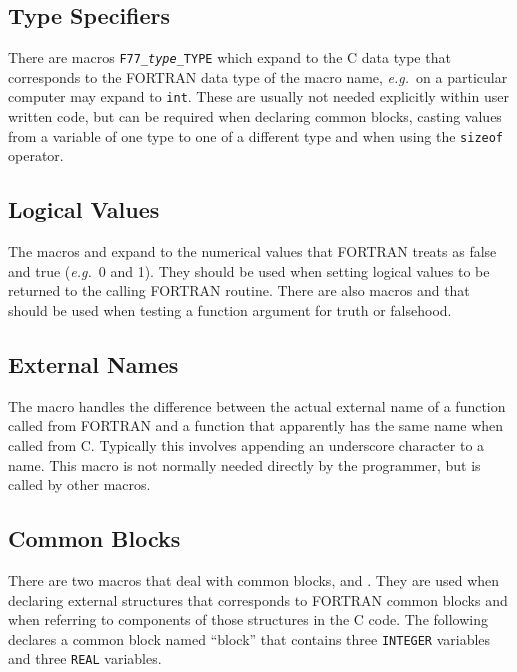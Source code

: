 \documentclass[twoside,11pt,nolof]{starlink}
\begin{document}
\subsection{Type Specifiers}

There are macros \texttt{F77\_\textit{type}\_TYPE}
which expand to the C data type that corresponds to the FORTRAN data type of
the macro name, \textit{e.g.}\ on a particular computer
 may expand to
\texttt{int}.
These are usually not needed explicitly within user written code, but can be
required when declaring common blocks, casting values from a variable of one
type to one of a different type and when using the \texttt{sizeof} operator.

\subsection{Logical Values}

The macros
and
expand to the
numerical values that FORTRAN treats as false and true ({\em{e.g.}}\ 0 and 1).
They should be used when setting logical values to be returned to the calling
FORTRAN routine.
There are also macros
and
that should be used when testing a function argument for truth or falsehood.

\subsection{External Names}

The macro
handles the difference between the
actual external name of a function called from FORTRAN and a function that
apparently has the same name when called from C\@. Typically this involves
appending an underscore character to a name. This macro is not normally needed
directly by the programmer, but is called by other macros.

\subsection{\label{f77_common}Common Blocks}

There are two macros that deal with common blocks,
and
\@.
They are used when declaring external
structures that corresponds to FORTRAN common blocks and when referring to
components of those structures in the C code. The following declares a common
block named ``block'' that contains three \texttt{INTEGER} variables and three
\texttt{REAL} variables.
\end{document}
